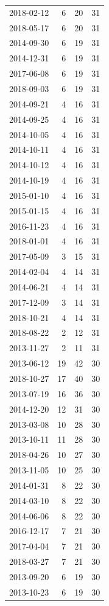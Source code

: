 \begin{tabular}{lrrr}
2018-02-12 & 6 & 20 & 31 \\
2018-05-17 & 6 & 20 & 31 \\
2014-09-30 & 6 & 19 & 31 \\
2014-12-31 & 6 & 19 & 31 \\
2017-06-08 & 6 & 19 & 31 \\
2018-09-03 & 6 & 19 & 31 \\
2014-09-21 & 4 & 16 & 31 \\
2014-09-25 & 4 & 16 & 31 \\
2014-10-05 & 4 & 16 & 31 \\
2014-10-11 & 4 & 16 & 31 \\
2014-10-12 & 4 & 16 & 31 \\
2014-10-19 & 4 & 16 & 31 \\
2015-01-10 & 4 & 16 & 31 \\
2015-01-15 & 4 & 16 & 31 \\
2016-11-23 & 4 & 16 & 31 \\
2018-01-01 & 4 & 16 & 31 \\
2017-05-09 & 3 & 15 & 31 \\
2014-02-04 & 4 & 14 & 31 \\
2014-06-21 & 4 & 14 & 31 \\
2017-12-09 & 3 & 14 & 31 \\
2018-10-21 & 4 & 14 & 31 \\
2018-08-22 & 2 & 12 & 31 \\
2013-11-27 & 2 & 11 & 31 \\
2013-06-12 & 19 & 42 & 30 \\
2018-10-27 & 17 & 40 & 30 \\
2013-07-19 & 16 & 36 & 30 \\
2014-12-20 & 12 & 31 & 30 \\
2013-03-08 & 10 & 28 & 30 \\
2013-10-11 & 11 & 28 & 30 \\
2018-04-26 & 10 & 27 & 30 \\
2013-11-05 & 10 & 25 & 30 \\
2014-01-31 & 8 & 22 & 30 \\
2014-03-10 & 8 & 22 & 30 \\
2014-06-06 & 8 & 22 & 30 \\
2016-12-17 & 7 & 21 & 30 \\
2017-04-04 & 7 & 21 & 30 \\
2018-03-27 & 7 & 21 & 30 \\
2013-09-20 & 6 & 19 & 30 \\
2013-10-23 & 6 & 19 & 30 \\

\end{tabular}
